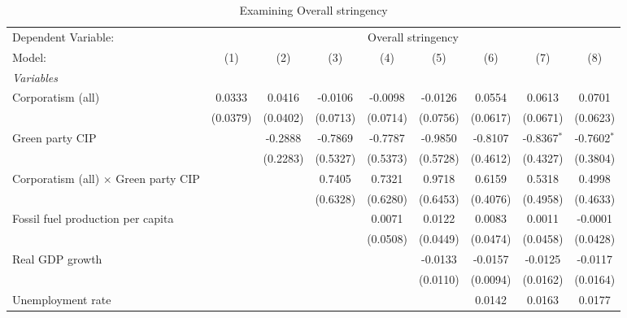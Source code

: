 
\begin{table}[htbp]
   \caption{Examining Overall stringency}
   \centering
   \begin{tabular}{lcccccccc}
      \tabularnewline \midrule \midrule
      Dependent Variable: & \multicolumn{8}{c}{Overall stringency}\\
      Model:                                      & (1)      & (2)      & (3)      & (4)      & (5)      & (6)      & (7)           & (8)\\  
      \midrule
      \emph{Variables}\\
      Corporatism (all)                           & 0.0333   & 0.0416   & -0.0106  & -0.0098  & -0.0126  & 0.0554   & 0.0613        & 0.0701\\   
                                                  & (0.0379) & (0.0402) & (0.0713) & (0.0714) & (0.0756) & (0.0617) & (0.0671)      & (0.0623)\\   
      Green party CIP                             &          & -0.2888  & -0.7869  & -0.7787  & -0.9850  & -0.8107  & -0.8367$^{*}$ & -0.7602$^{*}$\\   
                                                  &          & (0.2283) & (0.5327) & (0.5373) & (0.5728) & (0.4612) & (0.4327)      & (0.3804)\\   
      Corporatism (all) $\times$ Green party CIP  &          &          & 0.7405   & 0.7321   & 0.9718   & 0.6159   & 0.5318        & 0.4998\\   
                                                  &          &          & (0.6328) & (0.6280) & (0.6453) & (0.4076) & (0.4958)      & (0.4633)\\   
      Fossil fuel production per capita           &          &          &          & 0.0071   & 0.0122   & 0.0083   & 0.0011        & -0.0001\\   
                                                  &          &          &          & (0.0508) & (0.0449) & (0.0474) & (0.0458)      & (0.0428)\\   
      Real GDP growth                             &          &          &          &          & -0.0133  & -0.0157  & -0.0125       & -0.0117\\   
                                                  &          &          &          &          & (0.0110) & (0.0094) & (0.0162)      & (0.0164)\\   
      Unemployment rate                           &          &          &          &          &          & 0.0142   & 0.0163        & 0.0177\\   

\end{tabular}
\end{table}
